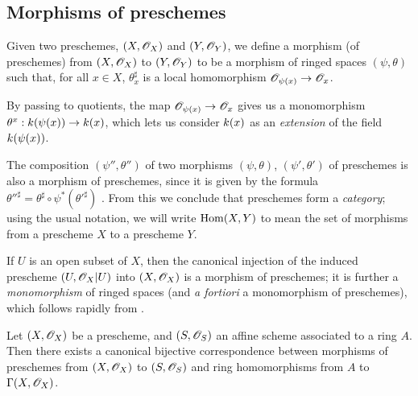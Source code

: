 \subsection{Morphisms of preschemes}
\label{subsection:prescheme-morphisms}

\begin{defn}[2.2.1]
\label{1.2.2.1}
Given two preschemes, $(X,\mathscr{O}_X)$ and $(Y,\mathscr{O}_Y)$, we define a morphism (of preschemes) from $(X,\mathscr{O}_X)$ to $(Y,\mathscr{O}_Y)$ to be a morphism of ringed spaces $(\psi,\theta)$ such that, for all $x\in X$, $\theta_x^\sharp$ is a local homomorphism $\OO_{\psi(x)}\to\OO_x$.
\end{defn}

By passing to quotients, the map $\OO_{\psi(x)}\to\OO_x$ gives us a monomorphism $\theta^x:\kres(\psi(x))\to\kres(x)$, which lets us consider $k(x)$ as an \emph{extension} of the field $k(\psi(x))$.

\begin{env}[2.2.2]
\label{1.2.2.2}
The composition $(\psi'',\theta'')$ of two morphisms $(\psi,\theta)$, $(\psi',\theta')$ of preschemes is also a morphism of preschemes, since it is given by the formula ${\theta''}^\sharp=\theta^\sharp\circ\psi^*({\theta'}^\sharp)$ .
From this we conclude that preschemes form a \emph{category};
using the usual notation, we will write ${\mathop{\mathrm{Hom}}\nolimits}(X,Y)$ to mean the set of morphisms from a prescheme $X$ to a prescheme $Y$.
\end{env}

\begin{exm}[2.2.3]
\label{1.2.2.3}
If $U$ is an open subset of $X$, then the canonical injection  of the induced prescheme $(U,\mathscr{O}_X|U)$ into $(X,\mathscr{O}_X)$ is a morphism of preschemes;
it is further a \emph{monomorphism} of ringed spaces (and \emph{a fortiori} a monomorphism of preschemes), which follows rapidly from .
\end{exm}

\begin{prop}[2.2.4]
\label{1.2.2.4}
Let $(X,\mathscr{O}_X)$ be a prescheme, and $(S,\mathscr{O}_S)$ an affine scheme associated to a ring $A$.
Then there exists a canonical bijective correspondence between morphisms of preschemes from $(X,\mathscr{O}_X)$ to $(S,\mathscr{O}_S)$ and ring homomorphisms from $A$ to $\Gamma(X,\mathscr{O}_X)$.
\end{prop}

